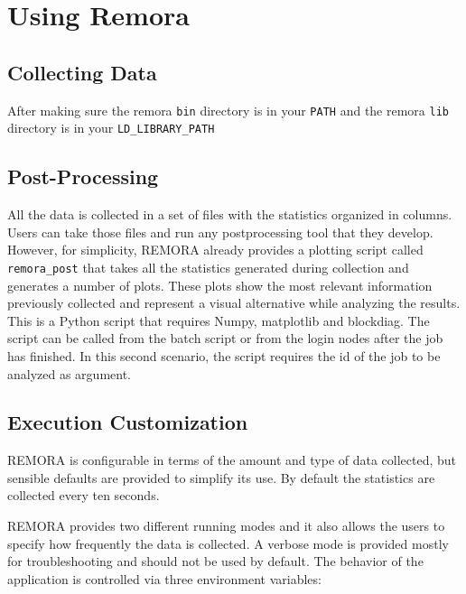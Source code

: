 \documentclass[10pt,a4paper]{report}
\begin{document}
\FloatBarrier
\chapter{Using Remora}

\section{Collecting Data}
After making sure the remora \verb+bin+ directory is in your \verb+PATH+ and the remora \verb+lib+ directory is in your \verb|LD_LIBRARY_PATH|

\section{Post-Processing}
All the data is collected in a set of files with the statistics organized in columns. Users can take those files and run any postprocessing tool that they develop. However, for simplicity, REMORA already provides a plotting script called \verb+remora_post+ that takes all the statistics generated during collection and generates a number of plots. These plots show the most relevant information previously collected and represent a visual alternative while analyzing the results. This is a Python script that requires Numpy, matplotlib and blockdiag. The script can be called from the batch script or from the login nodes after the job has finished. In this second scenario, the script requires the id of the job to be analyzed as argument.

\section{Execution Customization}\label{customize}

REMORA is configurable in terms of the amount and type of data collected, but sensible defaults are provided to simplify its use. By default the statistics are collected every ten seconds.

REMORA provides two different running modes and it also allows the users to specify how frequently the data is collected. A verbose mode is provided mostly for troubleshooting and should not be used by default. The behavior of the application is controlled via three environment variables:
\end{document}

